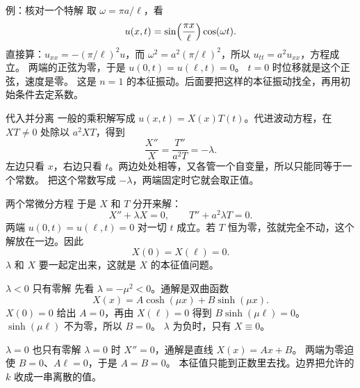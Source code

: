 \documentclass[fontset=windows, chinese, 10pt, xcolor=dvipsnames]{beamer}
\begin{document}
\begin{frame}{例：核对一个特解}
  取 $\omega=\pi a/\ell$，看
  \begin{equation*}
    u(x,t)=\sin\Bigl(\frac{\pi x}{\ell}\Bigr)\cos(\omega t).
  \end{equation*}
  直接算：$u_{xx}=-(\pi/\ell)^2 u$，而 $\omega^2=a^2(\pi/\ell)^2$，所以 $u_{tt}=a^2 u_{xx}$，方程成立。
  两端的正弦为零，于是 $u(0,t)=u(\ell,t)=0$。
  $t=0$ 时位移就是这个正弦，速度是零。
  \vspace{0.3em}
  这是 $n=1$ 的本征振动。后面要把这样的本征振动找全，再用初始条件去定系数。
\end{frame}

\begin{frame}{代入并分离}
  一般的乘积解写成 $u(x,t)=X(x)T(t)$。代进波动方程，在 $XT\neq 0$ 处除以 $a^2 XT$，得到
  \begin{equation*}
    \frac{X''}{X}=\frac{T''}{a^2T}=-\lambda.
  \end{equation*}
  左边只看 $x$，右边只看 $t$。两边处处相等，又各管一个自变量，所以只能同等于一个常数。
  把这个常数写成 $-\lambda$，两端固定时它就会取正值。
\end{frame}

\begin{frame}{两个常微分方程}
  于是 $X$ 和 $T$ 分开来解：
  \begin{equation*}
    X''+\lambda X=0,
    \qquad
    T''+a^2\lambda T=0.
  \end{equation*}
  两端 $u(0,t)=u(\ell,t)=0$ 对一切 $t$ 成立。若 $T$ 恒为零，弦就完全不动，这个解放在一边。因此
  \begin{equation*}
    X(0)=X(\ell)=0.
  \end{equation*}
  $\lambda$ 和 $X$ 要一起定出来，这就是 $X$ 的本征值问题。
\end{frame}

\begin{frame}{$\lambda<0$ 只有零解}
  先看 $\lambda=-\mu^2<0$。通解是双曲函数
  \begin{equation*}
    X(x)=A\cosh(\mu x)+B\sinh(\mu x).
  \end{equation*}
  $X(0)=0$ 给出 $A=0$，再由 $X(\ell)=0$ 得到 $B\sinh(\mu\ell)=0$。
  $\sinh(\mu\ell)$ 不为零，所以 $B=0$。
  \vspace{0.35em}
  $\lambda$ 为负时，只有 $X\equiv 0$。
\end{frame}

\begin{frame}{$\lambda=0$ 也只有零解}
  $\lambda=0$ 时 $X''=0$，通解是直线 $X(x)=Ax+B$。
  两端为零迫使 $B=0$、$A\ell=0$，于是 $A=B=0$。
  \vspace{0.4em}
  本征值只能到正数里去找。边界把允许的 $k$ 收成一串离散的值。
\end{frame}
\end{document}
